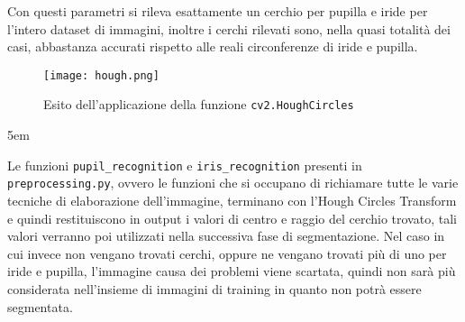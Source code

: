 Con questi parametri si rileva esattamente un cerchio per pupilla e iride per l’intero dataset di immagini, inoltre i cerchi rilevati sono, nella quasi totalità dei casi, abbastanza accurati rispetto alle reali circonferenze di iride e pupilla.

\begin{figure}[h]
  \centering
  \texttt{[image: hough.png]}
  \caption{Esito dell'applicazione della funzione \texttt{cv2.HoughCircles}}
\end{figure}

\emergencystretch 5em%

Le funzioni \texttt{pupil\_recognition} e \texttt{iris\_recognition} presenti in \texttt{preprocessing.py}, ovvero le funzioni che si occupano di richiamare tutte le varie tecniche di elaborazione dell’immagine, terminano con l’Hough Circles Transform e quindi restituiscono in output i  valori di centro e raggio del cerchio trovato, tali valori verranno poi utilizzati nella successiva fase di segmentazione. Nel caso in cui invece non vengano trovati cerchi, oppure ne vengano trovati più di uno per iride e pupilla, l’immagine causa dei problemi viene scartata, quindi non sarà più considerata nell’insieme di immagini di training in quanto non potrà essere segmentata.
